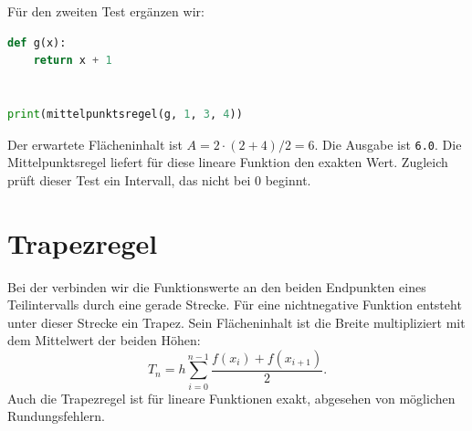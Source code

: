 \begin{myexercise}
\begin{myanswer}
Für den zweiten Test ergänzen wir:
\begin{lstlisting}[language=Python]
def g(x):
    return x + 1


print(mittelpunktsregel(g, 1, 3, 4))
\end{lstlisting}
Der erwartete Flächeninhalt ist $A=2\cdot(2+4)/2=6$. Die Ausgabe ist \lstinline|6.0|. Die Mittelpunktsregel liefert für diese lineare Funktion den exakten Wert. Zugleich prüft dieser Test ein Intervall, das nicht bei $0$ beginnt.
\end{myanswer}
\end{myexercise}

\section{Trapezregel}

Bei der  verbinden wir die Funktionswerte an den beiden Endpunkten eines Teilintervalls durch eine gerade Strecke. Für eine nichtnegative Funktion entsteht unter dieser Strecke ein Trapez. Sein Flächeninhalt ist die Breite multipliziert mit dem Mittelwert der beiden Höhen:
\[
    T_n = h\sum_{i=0}^{n-1}\frac{f(x_i)+f(x_{i+1})}{2}.
\]
Auch die Trapezregel ist für lineare Funktionen exakt, abgesehen von möglichen Rundungsfehlern.

